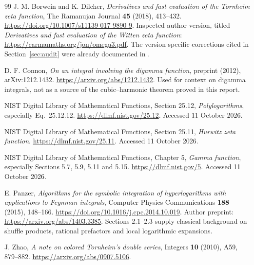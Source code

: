 \begin{thebibliography}{99}
J. M. Borwein and K. Dilcher,
\emph{Derivatives and fast evaluation of the Tornheim zeta function},
The Ramanujan Journal \textbf{45} (2018), 413--432.
\url{https://doi.org/10.1007/s11139-017-9890-9}.
Inspected author version, titled \emph{Derivatives and fast evaluation
of the Witten zeta function}:
\url{https://carmamaths.org/jon/omega3.pdf}.
The version-specific corrections cited in Section~\ref{sec:audit}
were already documented in \cite{IncomingCoincident}.

D. F. Connon, \emph{On an integral involving the digamma function},
preprint (2012), arXiv:1212.1432.
\url{https://arxiv.org/abs/1212.1432}.
Used for context on digamma integrals, not as a source of the
cubic--harmonic theorem proved in this report.

NIST Digital Library of Mathematical Functions,
Section 25.12, \emph{Polylogarithms}, especially Eq.~25.12.12.
\url{https://dlmf.nist.gov/25.12}. Accessed 11 October 2026.

NIST Digital Library of Mathematical Functions,
Section 25.11, \emph{Hurwitz zeta function}.
\url{https://dlmf.nist.gov/25.11}. Accessed 11 October 2026.

NIST Digital Library of Mathematical Functions,
Chapter 5, \emph{Gamma function}, especially Sections 5.7, 5.9,
5.11 and 5.15.
\url{https://dlmf.nist.gov/5}. Accessed 11 October 2026.

E. Panzer, \emph{Algorithms for the symbolic integration of
hyperlogarithms with applications to Feynman integrals},
Computer Physics Communications \textbf{188} (2015), 148--166.
\url{https://doi.org/10.1016/j.cpc.2014.10.019}.
Author preprint: \url{https://arxiv.org/abs/1403.3385}.
Sections 2.1--2.3 supply classical background on shuffle products,
rational prefactors and local logarithmic expansions.

J. Zhao, \emph{A note on colored Tornheim's double series},
Integers \textbf{10} (2010), A59, 879--882.
\url{https://arxiv.org/abs/0907.5106}.

\end{thebibliography}
